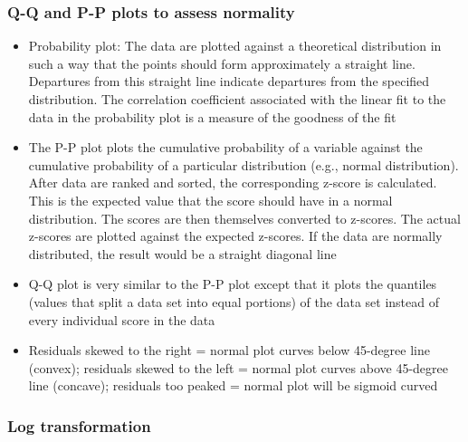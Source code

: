 \documentclass[]{article}
\begin{document}
\subsubsection{\texorpdfstring{\textbf{Q-Q and P-P plots to assess
normality}}{Q-Q and P-P plots to assess normality}}\label{q-q-and-p-p-plots-to-assess-normality}

\begin{itemize}
\item
  Probability plot: The data are plotted against a theoretical
  distribution in such a way that the points should form approximately a
  straight line. Departures from this straight line indicate departures
  from the specified distribution. The correlation coefficient
  associated with the linear fit to the data in the probability plot is
  a measure of the goodness of the fit
\item
  The P-P plot plots the cumulative probability of a variable against
  the cumulative probability of a particular distribution (e.g., normal
  distribution). After data are ranked and sorted, the corresponding
  z-score is calculated. This is the expected value that the score
  should have in a normal distribution. The scores are then themselves
  converted to z-scores. The actual z-scores are plotted against the
  expected z-scores. If the data are normally distributed, the result
  would be a straight diagonal line
\item
  Q-Q plot is very similar to the P-P plot except that it plots the
  quantiles (values that split a data set into equal portions) of the
  data set instead of every individual score in the data
\item
  Residuals skewed to the right = normal plot curves below 45-degree
  line (convex); residuals skewed to the left = normal plot curves above
  45-degree line (concave); residuals too peaked = normal plot will be
  sigmoid curved
\end{itemize}

\subsubsection{\texorpdfstring{\textbf{Log
transformation}}{Log transformation}}\label{log-transformation}
\end{document}
